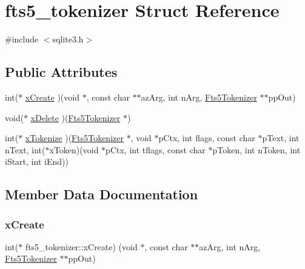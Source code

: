 \hypertarget{structfts5__tokenizer}{}\section{fts5\+\_\+tokenizer Struct Reference}
\label{structfts5__tokenizer}


{\ttfamily \#include $<$sqlite3.\+h$>$}

\subsection*{Public Attributes}
\begin{DoxyCompactItemize}
\item 
int($\ast$ \mbox{\hyperlink{structfts5__tokenizer_a61846ad000b2d38a1264c342c8201d5c}{x\+Create}} )(void $\ast$, const char $\ast$$\ast$az\+Arg, int n\+Arg, \mbox{\hyperlink{sqlite3_8h_ac015f88c5332d612a3125fc0014e468c}{Fts5\+Tokenizer}} $\ast$$\ast$pp\+Out)
\item 
void($\ast$ \mbox{\hyperlink{structfts5__tokenizer_aaaa88b9f3e50f0b1120a05fb1bbb251f}{x\+Delete}} )(\mbox{\hyperlink{sqlite3_8h_ac015f88c5332d612a3125fc0014e468c}{Fts5\+Tokenizer}} $\ast$)
\item 
int($\ast$ \mbox{\hyperlink{structfts5__tokenizer_ae65ca5a9b1e6d5c1ef09731fccefa577}{x\+Tokenize}} )(\mbox{\hyperlink{sqlite3_8h_ac015f88c5332d612a3125fc0014e468c}{Fts5\+Tokenizer}} $\ast$, void $\ast$p\+Ctx, int flags, const char $\ast$p\+Text, int n\+Text, int($\ast$x\+Token)(void $\ast$p\+Ctx, int tflags, const char $\ast$p\+Token, int n\+Token, int i\+Start, int i\+End))
\end{DoxyCompactItemize}


\subsection{Member Data Documentation}
\mbox{\label{structfts5__tokenizer_a61846ad000b2d38a1264c342c8201d5c}} 
\subsubsection{\texorpdfstring{xCreate}{xCreate}}
{\footnotesize\ttfamily int($\ast$ fts5\+\_\+tokenizer\+::x\+Create) (void $\ast$, const char $\ast$$\ast$az\+Arg, int n\+Arg, \mbox{\hyperlink{sqlite3_8h_ac015f88c5332d612a3125fc0014e468c}{Fts5\+Tokenizer}} $\ast$$\ast$pp\+Out)}

